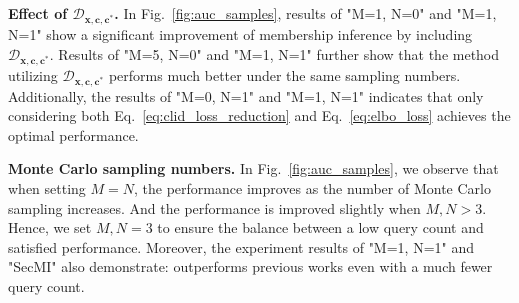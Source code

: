 \textbf{Effect of $ \mathcal{D}_{\mathbf{x},\mathbf{c},\mathbf{c}^*}$.} 
In Fig.~\ref{fig:auc_samples}, results of "M=1, N=0" and "M=1, N=1"  show a significant improvement of membership inference by including $ \mathcal{D}_{\mathbf{x},\mathbf{c},\mathbf{c}^*}$. Results of "M=5, N=0" and "M=1, N=1" further show that the method utilizing $\mathcal{D}_{\mathbf{x},\mathbf{c},\mathbf{c}^*}$ performs much better under the same sampling numbers. Additionally, the results of "M=0, N=1" and "M=1, N=1" indicates that only considering both Eq.~\eqref{eq:clid_loss_reduction} 
and Eq.~\eqref{eq:elbo_loss}  achieves the optimal performance. 


\textbf{Monte Carlo sampling numbers.} 
In Fig.~\ref{fig:auc_samples}, we observe that when setting $M=N$, the performance improves as the number of Monte Carlo sampling increases. And the performance is improved slightly when $M, N>3$. Hence, we set $M, N=3$ 
to ensure the balance between a low query count and satisfied performance. Moreover, the experiment results of "M=1, N=1" and "SecMI" also demonstrate: \clidth outperforms previous works even with a much fewer query count.


